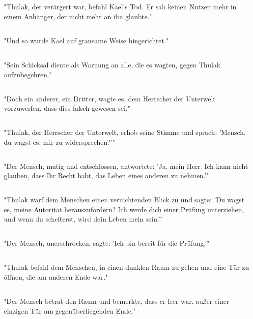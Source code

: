 \documentclass{article}
\begin{document}
\subsection{}
"Thulak, der verärgert war, befahl Kael's Tod. Er sah keinen Nutzen mehr in einem Anhänger, der nicht mehr an ihn glaubte."
\subsection{}
"Und so wurde Kael auf grausame Weise hingerichtet."
\subsection{}
"Sein Schicksal diente als Warnung an alle, die es wagten, gegen Thulak aufzubegehren."
\subsection{}
"Doch ein anderer, ein Dritter, wagte es, dem Herrscher der Unterwelt vorzuwerfen, dass dies falsch gewesen sei."
\subsection{}
"Thulak, der Herrscher der Unterwelt, erhob seine Stimme und sprach: 'Mensch, du wagst es, mir zu widersprechen?'"
\subsection{}
"Der Mensch, mutig und entschlossen, antwortete: 'Ja, mein Herr. Ich kann nicht glauben, dass Ihr Recht habt, das Leben eines anderen zu nehmen.'"
\subsection{}
"Thulak warf dem Menschen einen vernichtenden Blick zu und sagte: 'Du wagst es, meine Autorität herauszufordern? Ich werde dich einer Prüfung unterziehen, und wenn du scheiterst, wird dein Leben mein sein.'"
\subsection{}
"Der Mensch, unerschrocken, sagte: 'Ich bin bereit für die Prüfung.'"
\subsection{}
"Thulak befahl dem Menschen, in einen dunklen Raum zu gehen und eine Tür zu öffnen, die am anderen Ende war."
\subsection{}
"Der Mensch betrat den Raum und bemerkte, dass er leer war, außer einer einzigen Tür am gegenüberliegenden Ende."
\end{document}
